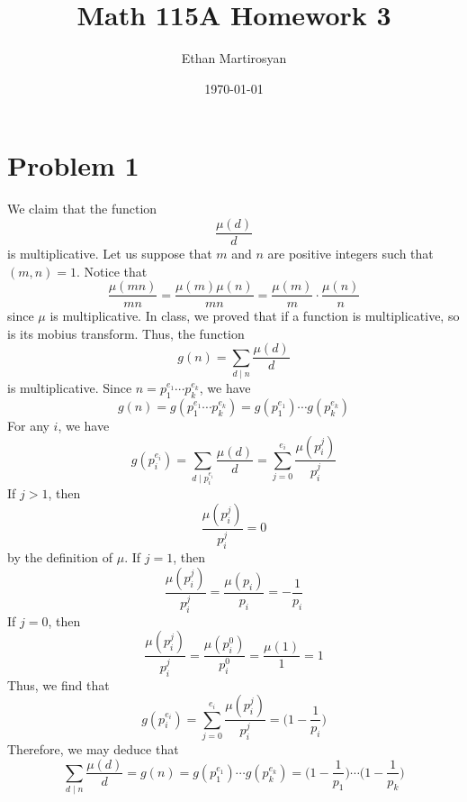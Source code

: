 \documentclass[12pt]{article}
\begin{document}
 
\title{Math 115A Homework 3}
\author{Ethan Martirosyan}
\date{\today}
\maketitle
{}
\hfuzz=50pt
\section*{Problem 1}
We claim that the function
\[
\frac{\mu(d)}{d}
\] is multiplicative. Let us suppose that $m$ and $n$ are positive integers such that $(m,n) = 1$. Notice that
\[
 \frac{\mu(mn)}{mn} = \frac{\mu(m)\mu(n)}{mn} = \frac{\mu(m)}{m} \cdot \frac{\mu(n)}{n}
\] since $\mu$ is multiplicative. In class, we proved that if a function is multiplicative, so is its mobius transform. Thus, the function 
\[
g(n) = \sum_{d \mid n} \frac{\mu(d)}{d}
\] is multiplicative. Since $n = p_1^{e_1} \cdots p_k^{e_k}$, we have
\[
g(n) = g(p_1^{e_1} \cdots p_k^{e_k}) = g(p_1^{e_1}) \cdots g(p_k^{e_k})
\] For any $i$, we have
\[
g(p_i^{e_i}) = \sum_{d \mid p_i^{e_i}} \frac{\mu(d)}{d} = \sum_{j = 0}^{e_i} \frac{\mu(p_i^j)}{p_i^j} 
\] If $j > 1$, then
\[
\frac{\mu(p_i^j)}{p_i^j} = 0
\] by the definition of $\mu$. If $j = 1$, then
\[
\frac{\mu(p_i^j)}{p_i^j} = \frac{\mu(p_i)}{p_i} = -\frac{1}{p_i}
\] If $j = 0$, then
\[
\frac{\mu(p_i^j)}{p_i^j} = \frac{\mu(p_i^0)}{p_i^0} = \frac{\mu(1)}{1} = 1
\] Thus, we find that
\[
g(p_i^{e_i}) = \sum_{j = 0}^{e_i} \frac{\mu(p_i^j)}{p_i^j}  = \bigg(1 - \frac{1}{p_i}\bigg)
\] Therefore, we may deduce that
\[
\sum_{d \mid n} \frac{\mu(d)}{d} = g(n) = g(p_1^{e_1}) \cdots g(p_k^{e_k}) = \bigg(1 - \frac{1}{p_1}\bigg) \cdots \bigg(1 - \frac{1}{p_k}\bigg)
\]
\newpage
\end{document}
